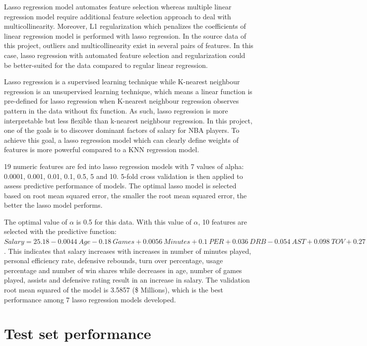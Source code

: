 \documentclass[letterpaper,12pt,twoside,]{pinp}
\begin{document}
Lasso regression model automates feature selection whereas multiple
linear regression model require additional feature selection approach to
deal with multicollinearity. Moreover, L1 regularization which penalizes
the coefficients of linear regression model is performed with lasso
regression. In the source data of this project, outliers and
multicollinearity exist in several pairs of features. In this case,
lasso regression with automated feature selection and regularization
could be better-suited for the data compared to regular linear
regression.

Lasso regression is a supervised learning technique while K-nearest
neighbour regression is an unsupervised learning technique, which means
a linear function is pre-defined for lasso regression when K-nearest
neighbour regression observes pattern in the data without fix function.
As such, lasso regression is more interpretable but less flexible than
k-nearest neighbour regression. In this project, one of the goals is to
discover dominant factors of salary for NBA players. To achieve this
goal, a lasso regression model which can clearly define weights of
features is more powerful compared to a KNN regression model.

19 numeric features are fed into lasso regression models with 7 values
of alpha: 0.0001, 0.001, 0.01, 0.1, 0.5, 5 and 10. 5-fold cross
validation is then applied to assess predictive performance of models.
The optimal lasso model is selected based on root mean squared error,
the smaller the root mean squared error, the better the lasso model
performs.

The optimal value of \(\alpha\) is 0.5 for this data. With this value of
\(\alpha\), 10 features are selected with the predictive function:
\(Salary = 25.18-0.0044~Age-0.18~Games+0.0056~Minutes+0.1~PER+0.036~DRB-0.054~AST+0.098~TOV+0.27~USG-0.23~RDtg+0.17～WS\).
This indicates that salary increases with increases in number of minutes
played, personal efficiency rate, defensive rebounds, turn over
percentage, usage percentage and number of win shares while decreases in
age, number of games played, assists and defensive rating result in an
increase in salary. The validation root mean squared of the model is
3.5857 (\$ Millions), which is the best performance among 7 lasso
regression models developed.

\hypertarget{test-set-performance}{%
\section{Test set performance}\label{test-set-performance}}
\end{document}
